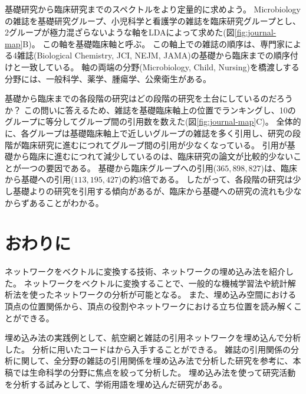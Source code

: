 \documentclass[12pt]{jarticle}
\begin{document}
基礎研究から臨床研究までのスペクトルをより定量的に求めよう。
Microbiologyの雑誌を基礎研究グループ、小児科学と看護学の雑誌を臨床研究グループとし、2グループが極力混ざらないような軸をLDAによって求めた(図\ref{fig:journal-map}B)。
この軸を基礎臨床軸と呼ぶ。
この軸上での雑誌の順序は、専門家による4雑誌(Biological Chemistry, JCI, NEJM, JAMA)の基礎から臨床までの順序付けと一致している\cite{Narin1976}。
軸の両端の分野(Microbiology, Child, Nursing)を橋渡しする分野には、一般科学、薬学、腫瘍学、公衆衛生がある。

基礎から臨床までの各段階の研究はどの段階の研究を土台にしているのだろうか？
この問いに答えるため、雑誌を基礎臨床軸上の位置でランキングし、10のグループに等分してグループ間の引用数を数えた(図\ref{fig:journal-map}C)。
全体的に、各グループは基礎臨床軸上で近しいグループの雑誌を多く引用し、研究の段階が臨床研究に進むにつれてグループ間の引用が少なくなっている。
引用が基礎から臨床に進むにつれて減少しているのは、臨床研究の論文が比較的少ないことが一つの要因である。
基礎から臨床グループへの引用($365,898,827$)は、臨床から基礎への引用($113,195,427$)の約3倍である。
したがって、各段階の研究は少し基礎よりの研究を引用する傾向があるが、臨床から基礎への研究の流れも少なからずあることがわかる。

\section{おわりに}

ネットワークをベクトルに変換する技術、ネットワークの埋め込み法を紹介した。
ネットワークをベクトルに変換することで、一般的な機械学習法や統計解析法を使ったネットワークの分析が可能となる。
また、埋め込み空間における頂点の位置関係から、頂点の役割やネットワークにおける立ち位置を読み解くことができる。


埋め込み法の実践例として、航空網と雑誌の引用ネットワークを埋め込んで分析した。
分析に用いたコードは\cite{code}から入手することができる。
雑誌の引用関係の分析に関して、全分野の雑誌の引用関係を埋め込み法で分析した研究\cite{Peng2020}を参考に、本稿では生命科学の分野に焦点を絞って分析した。
埋め込み法を使って研究活動を分析する試みとして、学術用語を埋め込んだ研究\cite{Chinazzi2019,Ke2019}がある。
\end{document}
